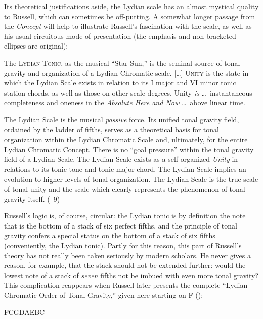 Its theoretical justifications aside, the Lydian scale has an almost mystical
quality to Russell, which can sometimes be off-putting. A somewhat longer
passage from the \emph{Concept} will help to illustrate Russell's fascination
with the scale, as well as his usual circuitous mode of presentation (the
emphasis and non-bracketed ellipses are original):
%
\begin{quoting}
  \singlespacing
  The \textsc{Lydian Tonic}, as the musical ``Star-Sun,'' is the seminal
  source of tonal gravity and organization of a Lydian Chromatic scale.
  [\ldots] \textsc{Unity} is the state in which the Lydian Scale exists in
  relation to its I major and VI minor tonic station chords, as well as those
  on other scale degrees. Unity \emph{is} \ldots\ instantaneous completeness
  and oneness in the \emph{Absolute Here and Now} \ldots\ above linear time.

  The Lydian Scale is the musical \emph{passive} force. Its unified tonal
  gravity field, ordained by the ladder of fifths, serves as a theoretical
  basis for tonal organization within the Lydian Chromatic Scale and,
  ultimately, for the entire Lydian Chromatic Concept. There is no ``goal
  pressure'' within the tonal gravity field of a Lydian Scale. The Lydian
  Scale exists as a self-organized \emph{Unity} in relations to its tonic tone
  and tonic major chord. The Lydian Scale implies an evolution to higher
  levels of tonal organization. The Lydian Scale is the true scale of tonal
  unity and the scale which clearly represents the phenomenon of tonal gravity
  itself. (--9)
\end{quoting}

Russell's logic is, of course, circular: the Lydian tonic is by definition the
note that is the bottom of a stack of six perfect fifths, and the principle of
tonal gravity confers a special status on the bottom of a stack of six fifths
(conveniently, the Lydian tonic). Partly for this reason, this part of
Russell's theory has not really been taken seriously by modern scholars. He
never gives a reason, for example, that the stack should not be extended
further: would the lowest note of a stack of \emph{seven} fifths not be imbued
with even more tonal gravity? This complication reappears when Russell later
presents the complete ``Lydian Chromatic Order of Tonal Gravity,'' given here
starting on F (): \\
{\centering F\quad C\quad G\quad D\quad A\quad E\quad B\quad C\sharp\quad
  \Aflat\quad \Eflat\quad \Bflat\quad \Gflat \par}

